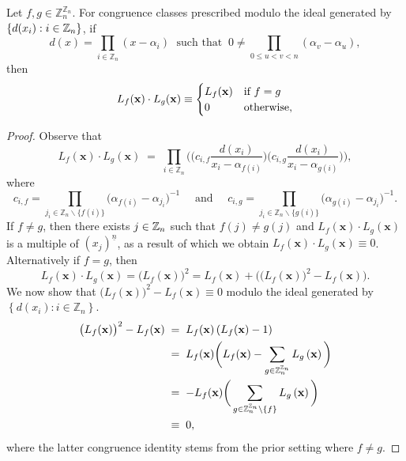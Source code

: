 \begin{proposition}
 \label{prop:Orthogonality}
 Let $f,g \in\mathbb{Z}_{n}^{\mathbb{Z}_{n}}$. For congruence classes prescribed modulo the ideal generated by $\{d(x_{i}):i \in {\mathbb Z}_n\}$, if
\[
d(x)=\prod_{i\in\mathbb{Z}_{n}}(x-\alpha_{i})\;\text{ such that }\:0\ne\prod_{0\le u<v<n}(\alpha_{v}-\alpha_{u}),
\]
then
\[
L_{f}({\bf x})\cdot L_{g}({\bf x})\equiv\begin{cases}
L_{f}({\bf x}) & \text{if }f=g\\
0 & \text{otherwise,}
\end{cases}
\]
\end{proposition}
\begin{proof} Observe that
\[
L_{f}(\mathbf{x})\cdot L_{g}(\mathbf{x})\;=\;\prod_{i\in\mathbb{Z}_{n}}\bigg(\big(c_{i,f}\frac{d(x_{i})}{x_{i}-\alpha_{f(i)}}\big)\big(c_{i,g}\frac{d(x_{i})}{x_{i}-\alpha_{g(i)}}\big)\bigg),
\]
where
\[
c_{i,f}=\prod_{j_{i}\in\mathbb{Z}_{n}\backslash\{f(i)\}}\big(\alpha_{f(i)}-\alpha_{j_{i}}\big)^{-1}\quad\text{ and }\quad c_{i,g}=\prod_{j_{i}\in\mathbb{Z}_{n}\backslash\{g(i)\}}\big(\alpha_{g(i)}-\alpha_{j_{i}}\big)^{-1}.
\]
If $f \neq g$, then there exists $j \in {\mathbb Z}_n$ such that $f(j)\neq g(j)$ and $L_{f}(\mathbf{x})\cdot L_{g}(\mathbf{x})$ is a multiple of $(x_{j})^{\underline{n}}$,
as a result of which we obtain $L_{f}(\mathbf{x})\cdot L_{g}(\mathbf{x}) \equiv 0$. Alternatively if $f = g$, then
\[
L_{f}(\mathbf{x})\cdot L_{g}(\mathbf{x})=\big(L_{f}(\mathbf{x})\big)^{2}=L_{f}(\mathbf{x})+\bigg(\big(L_{f}(\mathbf{x})\big)^{2}-L_{f}(\mathbf{x})\bigg).
\]
We now show that $\big(L_{f}(\mathbf{x})\big)^{2}-L_{f}(\mathbf{x})\equiv 0$ modulo the ideal generated by $\left\{ d(x_{i}):i\in\mathbb{Z}_{n}\right\}$.
\begin{align*}
\big(L_{f}(\mathbf{x})\big)^{2}-L_{f}(\mathbf{x})\; & =\;L_{f}(\mathbf{x})\left(L_{f}(\mathbf{x})-1\right)\\
 & =\;L_{f}(\mathbf{x})\bigg(L_{f}(\mathbf{x})-\sum_{g\in\mathbb{Z}_{n}^{\mathbb{Z}_{n}}}L_{g}\left({\bf x}\right)\bigg)\\
 & =\;-L_{f}(\mathbf{x})\bigg(\sum_{g\in\mathbb{Z}_{n}^{\mathbb{Z}_{n}}\setminus\{f\}}L_{g}\left({\bf x}\right)\bigg)\\
 & \equiv\;0,
\end{align*}
where the latter congruence identity stems from the prior setting where $f\ne g$.
\end{proof}

